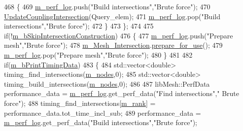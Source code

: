 \begin{DoxyCode}
468             \{
469                 \hyperlink{classcarl_1_1_intersection___search_aebe6210287a36909206b1a59f9cd17e0}{m\_perf\_log}.push(\textcolor{stringliteral}{"Build intersections"},\textcolor{stringliteral}{"Brute force"});
470                 \hyperlink{classcarl_1_1_intersection___search_a2a8731986e5f6963da7bada4c5eb9031}{UpdateCouplingIntersection}(Query\_elem);
471                 \hyperlink{classcarl_1_1_intersection___search_aebe6210287a36909206b1a59f9cd17e0}{m\_perf\_log}.pop(\textcolor{stringliteral}{"Build intersections"},\textcolor{stringliteral}{"Brute force"});
472             \}
473         \};
474 
475         \textcolor{keywordflow}{if}(!\hyperlink{classcarl_1_1_intersection___search_aef626956ac007f4c737aba3f2f69f2de}{m\_bSkipIntersectionConstruction})
476         \{
477             \hyperlink{classcarl_1_1_intersection___search_aebe6210287a36909206b1a59f9cd17e0}{m\_perf\_log}.push(\textcolor{stringliteral}{"Prepare mesh"},\textcolor{stringliteral}{"Brute force"});
478             \hyperlink{classcarl_1_1_intersection___search_a4946b764d66e3f26f323c5d043551c66}{m\_Mesh\_Intersection}.\hyperlink{classcarl_1_1_mesh___intersection_a5078651b6ae4cfdf97e43dfa172094b6}{prepare\_for\_use}();
479             \hyperlink{classcarl_1_1_intersection___search_aebe6210287a36909206b1a59f9cd17e0}{m\_perf\_log}.pop(\textcolor{stringliteral}{"Prepare mesh"},\textcolor{stringliteral}{"Brute force"});
480         \}
481 
482         \textcolor{keywordflow}{if}(\hyperlink{classcarl_1_1_intersection___search_a01537442f23786cbe1766ac340858020}{m\_bPrintTimingData})
483         \{
484             std::vector<double> timing\_find\_intersections(\hyperlink{classcarl_1_1_intersection___search_adcfd59960cfd05bc63e9bcf5a350a8ae}{m\_nodes},0);
485             std::vector<double> timing\_build\_intersections(\hyperlink{classcarl_1_1_intersection___search_adcfd59960cfd05bc63e9bcf5a350a8ae}{m\_nodes},0);
486 
487             libMesh::PerfData performance\_data = \hyperlink{classcarl_1_1_intersection___search_aebe6210287a36909206b1a59f9cd17e0}{m\_perf\_log}.get\_perf\_data(\textcolor{stringliteral}{"Find intersections"},\textcolor{stringliteral}{"
      Brute force"});
488             timing\_find\_intersections[\hyperlink{classcarl_1_1_intersection___search_a82564dfb7815673fcb9d9e3eb2d03b97}{m\_rank}] = performance\_data.tot\_time\_incl\_sub;
489             performance\_data = \hyperlink{classcarl_1_1_intersection___search_aebe6210287a36909206b1a59f9cd17e0}{m\_perf\_log}.get\_perf\_data(\textcolor{stringliteral}{"Build intersections"},\textcolor{stringliteral}{"Brute force"});

\end{DoxyCode}
